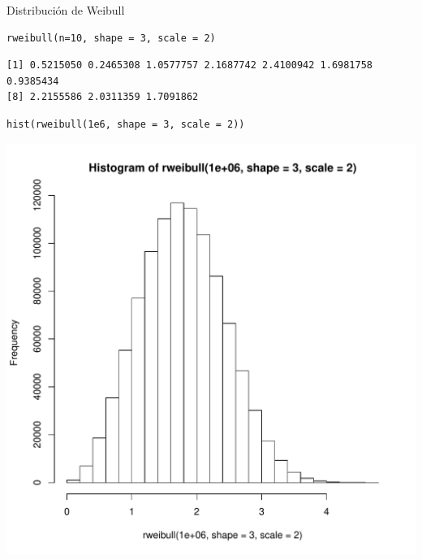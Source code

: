 \documentclass[xcolor={usenames,svgnames,dvipsnames}]{beamer}
\begin{document}
\begin{frame}[fragile,label=sec-3-6]{Distribución de Weibull}
 \lstset{language=R,label= ,caption= ,numbers=none}
\begin{lstlisting}
rweibull(n=10, shape = 3, scale = 2)
\end{lstlisting}

\begin{verbatim}
[1] 0.5215050 0.2465308 1.0577757 2.1687742 2.4100942 1.6981758 0.9385434
[8] 2.2155586 2.0311359 1.7091862
\end{verbatim}


\lstset{language=R,label= ,caption= ,numbers=none}
\begin{lstlisting}
hist(rweibull(1e6, shape = 3, scale = 2))
\end{lstlisting}

\includegraphics[height=0.6\textheight]{figs/rweibull.pdf}
\end{frame}
\end{document}
